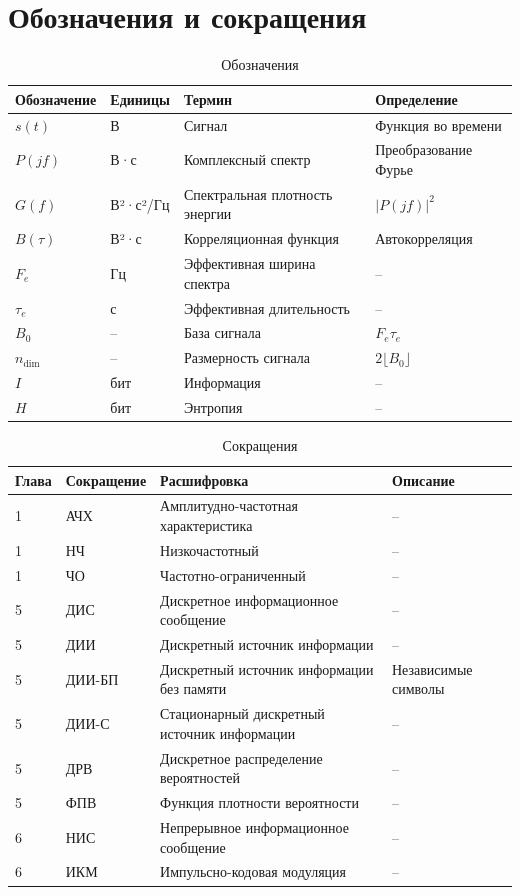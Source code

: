 \chapter{Обозначения и сокращения}

\begin{table}[!htbp]
	\caption{Обозначения}
	\begin{tabularx}{\textwidth}{|p{6em}|p{5em}|p{7em}|X|}
		\hline
		\textbf{Обозначение} & \textbf{Единицы} & \textbf{Термин} & \textbf{Определение} \\\hline
		$s(t)$ & В & Сигнал & Функция во времени \\\hline
		$P(jf)$ & В·с & Комплексный спектр & Преобразование Фурье \\\hline
		$G(f)$ & В²·с²/Гц & Спектральная плотность энергии & $|P(jf)|^2$ \\\hline
		$B(\tau)$ & В²·с & Корреляционная функция & Автокорреляция \\\hline
		$F_e$ & Гц & Эффективная ширина спектра & -- \\\hline
		$\tau_e$ & с & Эффективная длительность & -- \\\hline
		$B_0$ & -- & База сигнала & $F_e\tau_e$ \\\hline
		$n_{\mathrm{dim}}$ & -- & Размерность сигнала & $2\lfloor B_0\rfloor$ \\\hline
		$I$ & бит & Информация & -- \\\hline
		$H$ & бит & Энтропия & -- \\\hline
	\end{tabularx}
\end{table}
\clearpage

\begin{table}[!htbp]
	\caption{Сокращения}
	\begin{tabularx}{\textwidth}{|p{2.5em}|p{5em}|p{10em}|X|}
		\hline
		\textbf{Глава} & \textbf{Сокращение} & \textbf{Расшифровка} & \textbf{Описание} \\\hline
		1 & АЧХ & Амплитудно-частотная характеристика & -- \\\hline
		1 & НЧ & Низкочастотный & -- \\\hline
		1 & ЧО & Частотно-ограниченный & -- \\\hline
		5 & ДИС & Дискретное информационное сообщение & -- \\\hline
		5 & ДИИ & Дискретный источник информации & -- \\\hline
		5 & ДИИ-БП & Дискретный источник информации без памяти & Независимые символы \\\hline
		5 & ДИИ-С & Стационарный дискретный источник информации & -- \\\hline
		5 & ДРВ & Дискретное распределение вероятностей & -- \\\hline
		5 & ФПВ & Функция плотности вероятности & -- \\\hline
		6 & НИС & Непрерывное информационное сообщение & -- \\\hline
		6 & ИКМ & Импульсно-кодовая модуляция & -- \\\hline
	\end{tabularx}
\end{table}